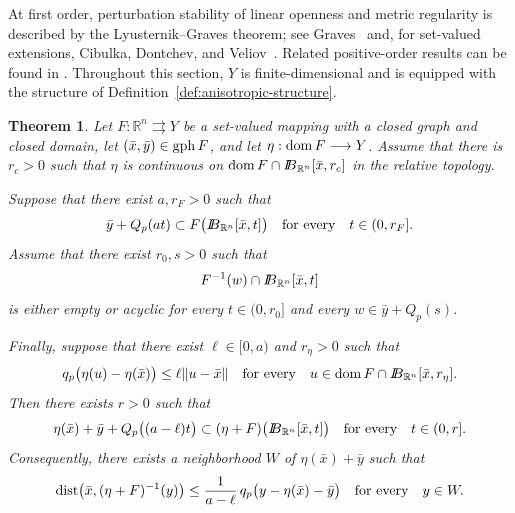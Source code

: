 \documentclass[11pt]{amsart}
\newtheorem{theorem}{Theorem}[section]
\theoremstyle{definition}
\theoremstyle{remark}
\newcommand{\tto}{\rightrightarrows}
\newcommand{\bx}{\bar x}
\newcommand{\by}{\bar y}
\newcommand{\R}{\mathbb R}
\newcommand{\gph}{\mathop{\rm gph}\nolimits}
\newcommand{\domm}{\mathop{\rm dom}\nolimits}
\newcommand{\dist}{\mathop{\rm dist}\nolimits}
\def\ball{{I\kern -.35em B}}
\begin{document}
	At first order, perturbation stability of linear openness and metric
	regularity is described by the Lyusternik--Graves theorem; see
	Graves~\cite{Graves} and, for set-valued extensions, Cibulka, Dontchev, and
	Veliov~\cite{CibulkaDontchevVeliov}. Related positive-order results can be
	found in \cite{YenYaoKienPositiveOrder,UderzoNonlinearRate,HeNgStability}.
	Throughout this section, $Y$ is finite-dimensional and is equipped with the
	structure of Definition~\ref{def:anisotropic-structure}.
	\begin{theorem}
		\label{thm:anisotropic-stability}
		Let $F:\R^n\tto Y$ be a set-valued mapping with a closed graph and
		closed domain, let $(\bx,\by)\in\gph F$, and let
		$\eta:\domm F\longrightarrow Y$. Assume that there is $r_c>0$ such that
		$\eta$ is continuous on
		$\domm F\cap\ball_{\R^n}[\bx,r_c]$ in the relative topology.
		
		Suppose that there exist $a,r_F>0$ such that
		\begin{equation}
			\by+Q_p(at)
			\subset
			F\bigl(\ball_{\R^n}[\bx,t]\bigr)
			\quad\text{for every}\quad t\in(0,r_F].
			\label{eq:base-anisotropic-openness}
		\end{equation}
		Assume that there exist $r_0,s>0$ such that
		$$
		F^{-1}(w)\cap\ball_{\R^n}[\bx,t]
		$$
		is either empty or acyclic for every $t\in(0,r_0]$ and every
		$w\in\by+Q_p(s)$.
		
		Finally, suppose that there exist
		$\ell\in[0,a)$ and  $r_\eta>0$
		such that
		\begin{equation}
			q_p\bigl(\eta(u)-\eta(\bx)\bigr)
			\le
			\ell\|u-\bx\|\quad\text{for every}\quad u\in\domm F\cap\ball_{\R^n}[\bx,r_\eta].
			\label{eq:local-qp-perturbation}
		\end{equation}
		Then there exists $r>0$ such that
		\begin{equation}
			\eta(\bx)+\by+Q_p\bigl((a-\ell)t\bigr)
			\subset
			(\eta+F)\bigl(\ball_{\R^n}[\bx,t]\bigr)
			\quad\text{for every}\quad t\in(0,r].
			\label{eq:perturbed-anisotropic-openness}
		\end{equation}
		Consequently, there exists a neighborhood $W$ of
		$\eta(\bx)+\by$ such that
		$$
		\dist\bigl(\bx,(\eta+F)^{-1}(y)\bigr)
		\le
		\frac{1}{a-\ell}\,
		q_p\bigl(y-\eta(\bx)-\by\bigr)
		\quad\text{for every}\quad y\in W.
		$$
	\end{theorem}
	
\end{document}
